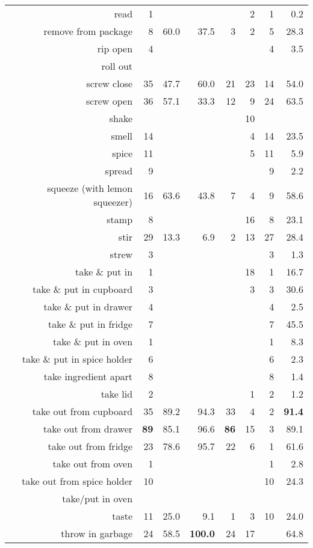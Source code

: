 \begin{tabular}{r r r@{\ \ }r@{\ \ }r@{\ \ }r@{\ \ }r r}
read & 1 &  &  &  & 2 & 1 & 0.2 \\
remove from package & 8 & 60.0 & 37.5 & 3 & 2 & 5 & 28.3 \\
rip open & 4 &  &  &  &  & 4 & 3.5 \\
roll out &  &  &  &  &  &  &  \\
screw close & 35 & 47.7 & 60.0 & 21 & 23 & 14 & 54.0 \\
screw open & 36 & 57.1 & 33.3 & 12 & 9 & 24 & 63.5 \\
shake &  &  &  &  & 10 &  &  \\
smell & 14 &  &  &  & 4 & 14 & 23.5 \\
spice & 11 &  &  &  & 5 & 11 & 5.9 \\
spread & 9 &  &  &  &  & 9 & 2.2 \\
squeeze (with lemon squeezer) & 16 & 63.6 & 43.8 & 7 & 4 & 9 & 58.6 \\
stamp & 8 &  &  &  & 16 & 8 & 23.1 \\
stir & 29 & 13.3 & 6.9 & 2 & 13 & 27 & 28.4 \\
strew & 3 &  &  &  &  & 3 & 1.3 \\
take \& put in  & 1 &  &  &  & 18 & 1 & 16.7 \\
take \& put in cupboard & 3 &  &  &  & 3 & 3 & 30.6 \\
take \& put in drawer & 4 &  &  &  &  & 4 & 2.5 \\
take \& put in fridge & 7 &  &  &  &  & 7 & 45.5 \\
take \& put in oven & 1 &  &  &  &  & 1 & 8.3 \\
take \& put in spice holder & 6 &  &  &  &  & 6 & 2.3 \\
take ingredient apart & 8 &  &  &  &  & 8 & 1.4 \\
take lid & 2 &  &  &  & 1 & 2 & 1.2 \\
take out from cupboard & 35 & 89.2 & 94.3 & 33 & 4 & 2 & \textbf{91.4} \\
take out from drawer & \textbf{89} & 85.1 & 96.6 & \textbf{86} & 15 & 3 & 89.1 \\
take out from fridge & 23 & 78.6 & 95.7 & 22 & 6 & 1 & 61.6 \\
take out from oven & 1 &  &  &  &  & 1 & 2.8 \\
take out from spice holder & 10 &  &  &  &  & 10 & 24.3 \\
take/put in oven &  &  &  &  &  &  &  \\
taste & 11 & 25.0 & 9.1 & 1 & 3 & 10 & 24.0 \\
throw in garbage & 24 & 58.5 & \textbf{100.0} & 24 & 17 &  & 64.8 \\

\end{tabular}
